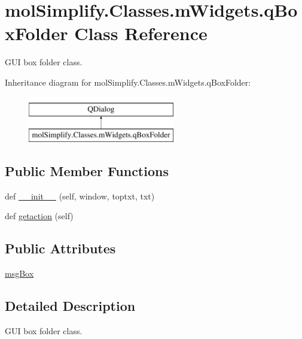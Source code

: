 \hypertarget{classmolSimplify_1_1Classes_1_1mWidgets_1_1qBoxFolder}{}\section{mol\+Simplify.\+Classes.\+m\+Widgets.\+q\+Box\+Folder Class Reference}
\label{classmolSimplify_1_1Classes_1_1mWidgets_1_1qBoxFolder}


G\+UI box folder class.  


Inheritance diagram for mol\+Simplify.\+Classes.\+m\+Widgets.\+q\+Box\+Folder\+:\begin{figure}[H]
\begin{center}
\leavevmode
\includegraphics[height=2.000000cm]{classmolSimplify_1_1Classes_1_1mWidgets_1_1qBoxFolder}
\end{center}
\end{figure}
\subsection*{Public Member Functions}
\begin{DoxyCompactItemize}
\item 
def \hyperlink{classmolSimplify_1_1Classes_1_1mWidgets_1_1qBoxFolder_a619142b92e22bd580fe101c12b86131d}{\+\_\+\+\_\+init\+\_\+\+\_\+} (self, window, toptxt, txt)
\item 
def \hyperlink{classmolSimplify_1_1Classes_1_1mWidgets_1_1qBoxFolder_a42b4841cdd10db50295cfb41dcbd4b45}{getaction} (self)
\end{DoxyCompactItemize}
\subsection*{Public Attributes}
\begin{DoxyCompactItemize}
\item 
\hyperlink{classmolSimplify_1_1Classes_1_1mWidgets_1_1qBoxFolder_ae361b015d43881534ea206e92332ded2}{msg\+Box}
\end{DoxyCompactItemize}


\subsection{Detailed Description}
G\+UI box folder class. 

